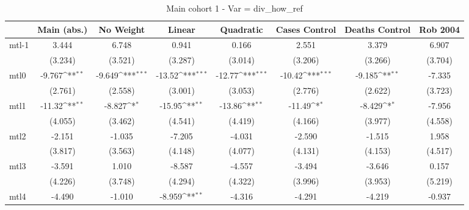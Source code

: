 \documentclass{article}
\begin{document}
{
\def\sym#1{\ifmmode^{#1}\else\(^{#1}\)\fi}
\begin{longtable}{l*{7}{c}}
\caption{Main cohort 1 - Var = div\_how\_ref}\\
\hline\hline\endfirsthead\hline\endhead\hline\endfoot\endlastfoot
                &\multicolumn{1}{c}{Main (abs.)}&\multicolumn{1}{c}{No Weight}&\multicolumn{1}{c}{Linear}&\multicolumn{1}{c}{Quadratic}&\multicolumn{1}{c}{Cases Control}&\multicolumn{1}{c}{Deaths Control}&\multicolumn{1}{c}{Rob 2004}\\
\hline
mtl-1           &    3.444         &    6.748         &    0.941         &    0.166         &    2.551         &    3.379         &    6.907         \\
                &  (3.234)         &  (3.521)         &  (3.287)         &  (3.014)         &  (3.206)         &  (3.266)         &  (3.704)         \\
mtl0            &   -9.767\sym{**} &   -9.649\sym{***}&   -13.52\sym{***}&   -12.77\sym{***}&   -10.42\sym{***}&   -9.185\sym{**} &   -7.335         \\
                &  (2.761)         &  (2.558)         &  (3.001)         &  (3.053)         &  (2.776)         &  (2.622)         &  (3.723)         \\
mtl1            &   -11.32\sym{**} &   -8.827\sym{*}  &   -15.95\sym{**} &   -13.86\sym{**} &   -11.49\sym{*}  &   -8.429\sym{*}  &   -7.956         \\
                &  (4.055)         &  (3.462)         &  (4.541)         &  (4.419)         &  (4.166)         &  (3.977)         &  (4.558)         \\
mtl2            &   -2.151         &   -1.035         &   -7.205         &   -4.031         &   -2.590         &   -1.515         &    1.958         \\
                &  (3.817)         &  (3.563)         &  (4.148)         &  (4.077)         &  (4.131)         &  (4.153)         &  (4.517)         \\
mtl3            &   -3.591         &    1.010         &   -8.587         &   -4.557         &   -3.494         &   -3.646         &    0.157         \\
                &  (4.226)         &  (3.748)         &  (4.294)         &  (4.322)         &  (3.996)         &  (3.953)         &  (5.219)         \\
mtl4            &   -4.490         &   -1.010         &   -8.959\sym{**} &   -4.316         &   -4.291         &   -4.219         &   -0.937         \\

\end{longtable}}
\end{document}
